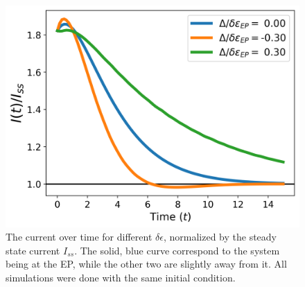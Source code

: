 \documentclass[../main.tex]{subfiles}
\begin{document}
\begin{figure}[H]
\begin{minipage}[t]{0.48\textwidth}
        \includegraphics[width=\textwidth]{figures/curr_diff_de.png}
        \caption{The current over time for different $\delta\epsilon$, normalized by the steady state current $I_{ss}$. The solid, blue curve correspond to the system being at the EP, while the other two are slightly away from it. All simulations were done with the same initial condition.}
    \label{fig:diffde}
    \end{minipage}\hfill
\end{figure}
\end{document}
